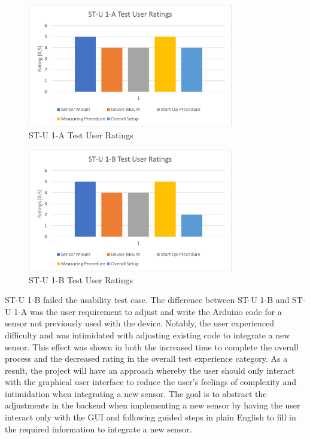 \documentclass[12pt, titlepage]{article}
\begin{document}
  \begin{figure}[htbp!]
    \begin{center}
    \includegraphics[width=0.8\textwidth]{ST-U_1-A_TestUserRatings}
    \caption{ST-U 1-A Test User Ratings}
    \end{center}
    \end{figure}

  \begin{figure}[htbp!]
    \begin{center}
    \includegraphics[width=0.8\textwidth]{ST-U_1-B_TestUserRatings}
    \caption{ST-U 1-B Test User Ratings}
    \end{center}
    \end{figure}

  ST-U 1-B failed the usability test case. The difference between ST-U 1-B and ST-U 1-A was the user requirement to adjust and write the Arduino code for a sensor not previously used with the device. Notably, the user experienced difficulty and was intimidated with adjusting existing code to integrate a new sensor. This effect was shown in both the increased time to complete the overall process and the decreased rating in the overall test experience category. As a result, the project will have an approach whereby the user should only interact with the graphical user interface to reduce the user's feelings of complexity and intimidation when integrating a new sensor. The goal is to abstract the adjustments in the backend when implementing a new sensor by having the user interact only with the GUI and following guided steps in plain English to fill in the required information to integrate a new sensor. \\
\end{document}
